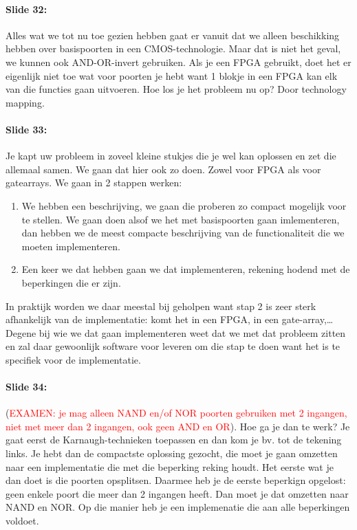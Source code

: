 \documentclass[10pt,a4paper]{book}
\begin{document}
\paragraph{Slide 32:} Alles wat we tot nu toe gezien hebben gaat er vanuit dat we alleen beschikking hebben over basispoorten in een CMOS-technologie. Maar dat is niet het geval, we kunnen ook AND-OR-invert gebruiken. Als je een FPGA gebruikt, doet het er eigenlijk niet toe wat voor poorten je hebt want 1 blokje in een FPGA kan elk van die functies gaan uitvoeren. Hoe los je het probleem nu op? Door technology mapping.

\paragraph{Slide 33:} Je kapt uw probleem in zoveel kleine stukjes die je wel kan oplossen en zet die allemaal samen. We gaan dat hier ook zo doen. Zowel voor FPGA als voor gatearrays. We gaan in 2 stappen werken:
\begin{enumerate}
\item We hebben een beschrijving, we gaan die proberen zo compact mogelijk voor te stellen. We gaan doen alsof we het met basispoorten gaan imlementeren, dan hebben we de meest compacte beschrijving van de functionaliteit die we moeten implementeren.
\item Een keer we dat hebben gaan we dat implementeren, rekening hodend met de beperkingen die er zijn. 
\end{enumerate}	
In praktijk worden we daar meestal bij geholpen want stap 2 is zeer sterk afhankelijk van de implementatie: komt het in een FPGA, in een gate-array,\ldots Degene bij wie we dat gaan implementeren weet dat we met dat probleem zitten en zal daar gewoonlijk software voor leveren om die stap te doen want het is te specifiek voor de implementatie.

\paragraph{Slide 34:} (\textcolor{red}{EXAMEN: je mag alleen NAND en/of NOR poorten gebruiken met 2 ingangen, niet met meer dan 2 ingangen, ook geen AND en OR}). Hoe ga je dan te werk? Je gaat eerst de Karnaugh-technieken toepassen en dan kom je bv. tot de tekening links. Je hebt dan de compactste oplossing gezocht, die moet je gaan omzetten naar een implementatie die met die beperking reking houdt. Het eerste wat je dan doet is die poorten opsplitsen. Daarmee heb je de eerste beperkign opgelost: geen enkele poort die meer dan 2 ingangen heeft. Dan moet je dat omzetten naar NAND en NOR. Op die manier heb je een implemenatie die aan alle beperkingen voldoet.
\end{document}
